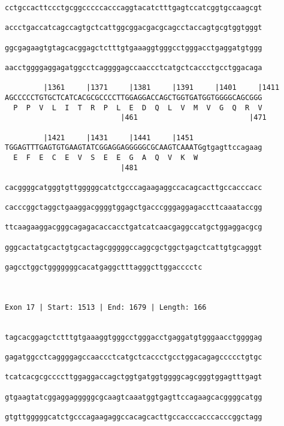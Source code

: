 \documentclass{article}
\begin{document}
\begin{Verbatim}
cctgccacttccctgcggcccccacccaggtacatctttgagtccatcggtgccaagcgt

accctgaccatcagccagtgctcattggcggacgacgcagcctaccagtgcgtggtgggt

ggcgagaagtgtagcacggagctctttgtgaaaggtgggcctgggacctgaggatgtggg

aacctggggaggagatggcctcaggggagccaaccctcatgctcaccctgcctggacaga

         |1361     |1371     |1381     |1391     |1401     |1411
AGCCCCCTGTGCTCATCACGCGCCCCTTGGAGGACCAGCTGGTGATGGTGGGGCAGCGGG
  P  P  V  L  I  T  R  P  L  E  D  Q  L  V  M  V  G  Q  R  V
                           |461                          |471
  
         |1421     |1431     |1441     |1451                
TGGAGTTTGAGTGTGAAGTATCGGAGGAGGGGGCGCAAGTCAAATGgtgagttccagaag
  E  F  E  C  E  V  S  E  E  G  A  Q  V  K  W               
                           |481                           
  
cacggggcatgggtgttgggggcatctgcccagaagaggccacagcacttgccacccacc
                                                            
cacccggctaggctgaaggacggggtggagctgacccgggaggagaccttcaaataccgg
                                                            
ttcaagaaggacgggcagagacaccacctgatcatcaacgaggccatgctggaggacgcg
                                                            
gggcactatgcactgtgcactagcgggggccaggcgctggctgagctcattgtgcagggt
                                                            
gagcctggctgggggggcacatgaggctttagggcttggacccctc
                                              
                                              
 
Exon 17 | Start: 1513 | End: 1679 | Length: 166


tagcacggagctctttgtgaaaggtgggcctgggacctgaggatgtgggaacctggggag
                                                            
gagatggcctcaggggagccaaccctcatgctcaccctgcctggacagagccccctgtgc
                                                            
tcatcacgcgccccttggaggaccagctggtgatggtggggcagcgggtggagtttgagt
                                                            
gtgaagtatcggaggagggggcgcaagtcaaatggtgagttccagaagcacggggcatgg
                                                            
gtgttgggggcatctgcccagaagaggccacagcacttgccacccacccacccggctagg
                                                            

\end{Verbatim}
\end{document}

